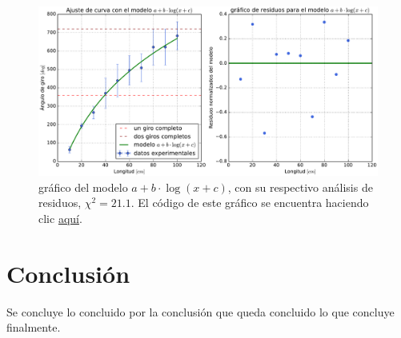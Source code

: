 \documentclass{article}
\begin{document}
\begin{figure}[ht]
    \centering
    \includegraphics[scale=0.5]{Informe/img/grafico-modelo-alogb.pdf}
    \caption{gráfico del modelo $a + b \cdot \log(x + c)$, con su respectivo análisis de residuos, $\chi^2 = 21.1$. El código de este gráfico se encuentra haciendo clic \href{https://github.com/ayalin7/El-proyectito/blob/main/graficos/grafico-modelo-alogb.py}{aquí}.}
    \label{fig:alogb}
\end{figure}

\section{Conclusión}
Se concluye lo concluido por la conclusión que queda concluido lo que concluye finalmente.



\end{document}
